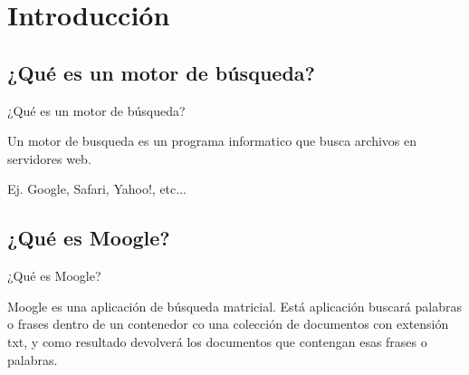 \section{Introducción}\label{sec:intro}

\subsection{¿Qué es un motor de búsqueda?}
\begin{frame}{¿Qué es un motor de búsqueda?}
 \begin{center}
    Un motor de busqueda es un programa informatico que busca archivos en servidores web.
    
    Ej. Google, Safari, Yahoo!, etc...
 \end{center}
 \end{frame}
 \subsection{¿Qué es Moogle?}
 \begin{frame}{¿Qué es Moogle?}
 \begin{center}
 	Moogle es una aplicación de búsqueda matricial. Está aplicación buscará palabras o frases dentro de un contenedor co una colección de documentos con extensión txt, y como resultado devolverá los documentos que contengan esas frases o palabras.
 \end{center}
\end{frame}
